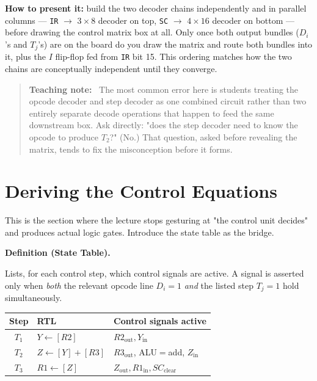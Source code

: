 \documentclass[11pt]{article}
\newenvironment{definitionbox}[1]{%
  \par\noindent\textbf{Definition (#1).}\ \itshape
}{\par\vspace{0.3em}}
\newenvironment{teachingaside}{\begin{quote}\small\color{primary-gold}\textbf{Teaching note:}\ }{\end{quote}}
\begin{document}
\textbf{How to present it:} build the two decoder chains independently and in parallel columns --- \texttt{IR} $\to$ $3{\times}8$ decoder on top, \texttt{SC} $\to$ $4{\times}16$ decoder on bottom --- before drawing the control matrix box at all. Only once both output bundles ($D_i$'s and $T_j$'s) are on the board do you draw the matrix and route both bundles into it, plus the $I$ flip-flop fed from \texttt{IR} bit 15. This ordering matches how the two chains are conceptually independent until they converge.

\begin{teachingaside}
The most common error here is students treating the opcode decoder and step decoder as one combined circuit rather than two entirely separate decode operations that happen to feed the same downstream box. Ask directly: "does the step decoder need to know the opcode to produce $T_2$?" (No.) That question, asked before revealing the matrix, tends to fix the misconception before it forms.
\end{teachingaside}

\section{Deriving the Control Equations}
\label{sec:equations}

This is the section where the lecture stops gesturing at "the control unit decides" and produces actual logic gates. Introduce the state table as the bridge.

\begin{definitionbox}{State Table}
Lists, for each control step, which control signals are active. A signal is asserted only when \emph{both} the relevant opcode line $D_i=1$ \emph{and} the listed step $T_j=1$ hold simultaneously.
\end{definitionbox}

\begin{center}
\footnotesize
\begin{tabular}{@{}cll@{}}
\toprule
\textbf{Step} & \textbf{RTL} & \textbf{Control signals active} \\
\midrule
$T_1$ & $Y \gets [R2]$            & $R2_{\text{out}}, Y_{\text{in}}$ \\
$T_2$ & $Z \gets [Y] + [R3]$      & $R3_{\text{out}}$, ALU$=$add, $Z_{\text{in}}$ \\
$T_3$ & $R1 \gets [Z]$            & $Z_{\text{out}}, R1_{\text{in}}, SC_{\text{clear}}$ \\
\bottomrule
\end{tabular}
\end{center}
\end{document}
